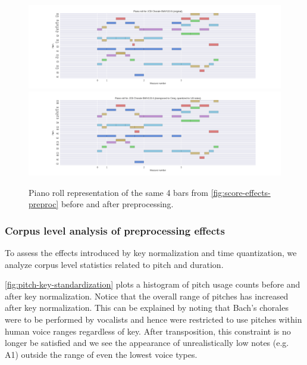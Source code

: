\documentclass[dissertation.tex]{subfiles}
\begin{document}
\begin{figure}[htpb]
    \centering
        \includegraphics[width=1.0\linewidth]{Figures/bwv133-6-original-piano-roll.png}
        \includegraphics[width=1.0\linewidth]{Figures/bwv133-6-preproc-piano-roll.png}
    \caption{Piano roll representation of the same 4 bars from \autoref{fig:score-effects-preproc}
    before and after preprocessing.}
    \label{fig:piano-roll-effects-preproc}
\end{figure}

\subsubsection{Corpus level analysis of preprocessing effects}

To assess the effects introduced by key normalization and time quantization,
we analyze corpus level statistics related to pitch and duration.

\autoref{fig:pitch-key-standardization} plots a histogram of pitch usage counts
before and after key normalization. Notice that the overall range of pitches
has increased after key normalization. This can be explained by noting that
Bach's chorales were to be performed by vocalists and hence were restricted to
use pitches within human voice ranges regardless of key. After transposition,
this constraint is no longer be satisfied and we see the appearance of
unrealistically low notes (e.g. A1) outside the range of even the lowest voice
types.
\end{document}
